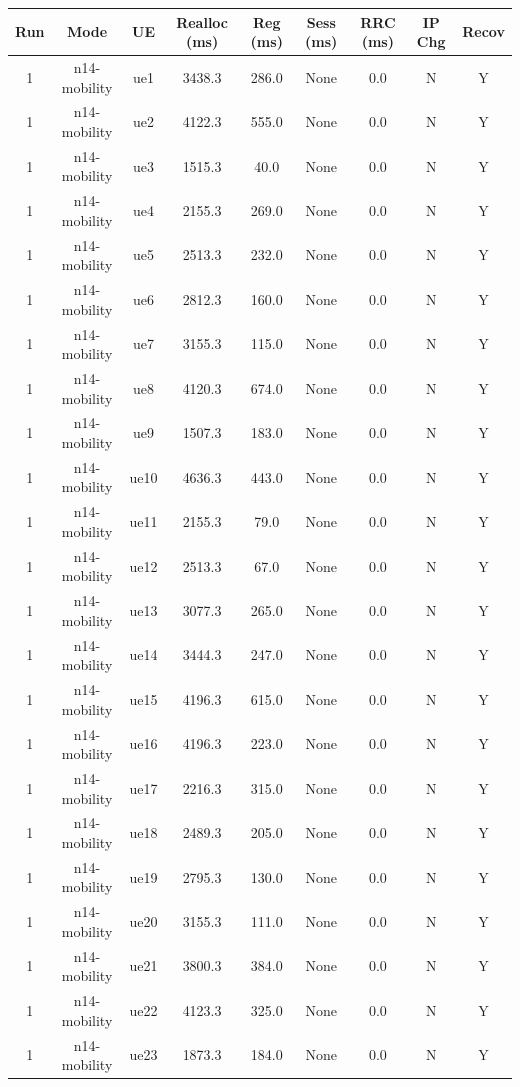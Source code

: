 \begin{table}[ht]
\centering
\begin{tabular}{|c|c|c|c|c|c|c|c|c|}
\hline
Run & Mode & UE & Realloc (ms) & Reg (ms) & Sess (ms) & RRC (ms) & IP Chg & Recov \\
\hline
1 & n14-mobility & ue1 & 3438.3 & 286.0 & None & 0.0 & N & Y \\
1 & n14-mobility & ue2 & 4122.3 & 555.0 & None & 0.0 & N & Y \\
1 & n14-mobility & ue3 & 1515.3 & 40.0 & None & 0.0 & N & Y \\
1 & n14-mobility & ue4 & 2155.3 & 269.0 & None & 0.0 & N & Y \\
1 & n14-mobility & ue5 & 2513.3 & 232.0 & None & 0.0 & N & Y \\
1 & n14-mobility & ue6 & 2812.3 & 160.0 & None & 0.0 & N & Y \\
1 & n14-mobility & ue7 & 3155.3 & 115.0 & None & 0.0 & N & Y \\
1 & n14-mobility & ue8 & 4120.3 & 674.0 & None & 0.0 & N & Y \\
1 & n14-mobility & ue9 & 1507.3 & 183.0 & None & 0.0 & N & Y \\
1 & n14-mobility & ue10 & 4636.3 & 443.0 & None & 0.0 & N & Y \\
1 & n14-mobility & ue11 & 2155.3 & 79.0 & None & 0.0 & N & Y \\
1 & n14-mobility & ue12 & 2513.3 & 67.0 & None & 0.0 & N & Y \\
1 & n14-mobility & ue13 & 3077.3 & 265.0 & None & 0.0 & N & Y \\
1 & n14-mobility & ue14 & 3444.3 & 247.0 & None & 0.0 & N & Y \\
1 & n14-mobility & ue15 & 4196.3 & 615.0 & None & 0.0 & N & Y \\
1 & n14-mobility & ue16 & 4196.3 & 223.0 & None & 0.0 & N & Y \\
1 & n14-mobility & ue17 & 2216.3 & 315.0 & None & 0.0 & N & Y \\
1 & n14-mobility & ue18 & 2489.3 & 205.0 & None & 0.0 & N & Y \\
1 & n14-mobility & ue19 & 2795.3 & 130.0 & None & 0.0 & N & Y \\
1 & n14-mobility & ue20 & 3155.3 & 111.0 & None & 0.0 & N & Y \\
1 & n14-mobility & ue21 & 3800.3 & 384.0 & None & 0.0 & N & Y \\
1 & n14-mobility & ue22 & 4123.3 & 325.0 & None & 0.0 & N & Y \\
1 & n14-mobility & ue23 & 1873.3 & 184.0 & None & 0.0 & N & Y \\

\end{tabular}
\end{table}
